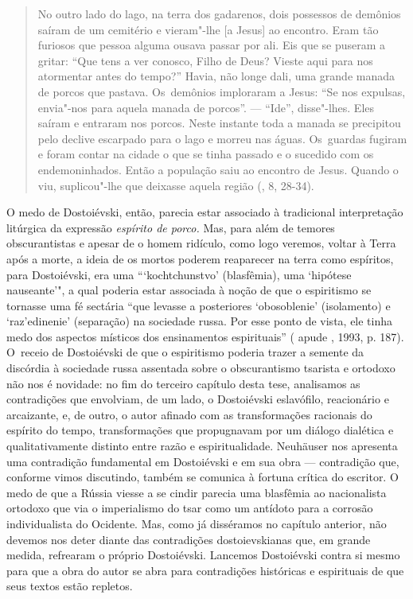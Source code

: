 \begin{quote}
No outro lado do lago, na terra dos gadarenos, dois possessos de
demônios saíram de um cemitério e vieram"-lhe {[}a Jesus{]} ao encontro.
Eram tão furiosos que pessoa alguma ousava passar por ali. Eis que se
puseram a gritar: ``Que tens a ver conosco, Filho de Deus? Vieste aqui
para nos atormentar antes do tempo?'' Havia, não longe dali, uma grande
manada de porcos que pastava. Os~demônios imploraram a Jesus: ``Se nos
expulsas, envia"-nos para aquela manada de porcos''. --- ``Ide'',
disse"-lhes. Eles saíram e entraram nos porcos. Neste instante toda a
manada se precipitou pelo declive escarpado para o lago e morreu nas
águas. Os~guardas fugiram e foram contar na cidade o que se tinha
passado e o sucedido com os endemoninhados. Então a população saiu ao
encontro de Jesus. Quando o viu, suplicou"-lhe que deixasse aquela região
(, 8, 28-34).
\end{quote}

O medo de Dostoiévski, então, parecia estar associado à tradicional
interpretação litúrgica da expressão \emph{espírito de porco.} Mas, para
além de temores obscurantistas e apesar de o homem ridículo, como logo
veremos, voltar à Terra após a morte, a ideia de os mortos poderem
reaparecer na terra como espíritos, para Dostoiévski, era uma
```kochtchunstvo' (blasfêmia), uma `hipótese nauseante'", a qual
poderia estar associada à noção de que o espiritismo se tornasse uma fé
sectária ``que levasse a posteriores `obosoblenie' (isolamento) e
`raz'edinenie' (separação) na sociedade russa. Por esse ponto de
vista, ele tinha medo dos aspectos místicos dos ensinamentos
espirituais'' ( apude , 1993, p. 187). O~receio de
Dostoiévski de que o espiritismo poderia trazer a semente da discórdia à
sociedade russa assentada sobre o obscurantismo tsarista e ortodoxo não
nos é novidade: no fim do terceiro capítulo desta tese, analisamos as
contradições que envolviam, de um lado, o Dostoiévski eslavófilo,
reacionário e arcaizante, e, de outro, o autor afinado com as
transformações racionais do espírito do tempo, transformações que
propugnavam por um diálogo dialética e qualitativamente distinto entre
razão e espiritualidade. Neuhäuser nos apresenta uma contradição
fundamental em Dostoiévski e em sua obra --- contradição que, conforme
vimos discutindo, também se comunica à fortuna crítica do escritor. O
medo de que a Rússia viesse a se cindir parecia uma blasfêmia ao
nacionalista ortodoxo que via o imperialismo do tsar como um antídoto
para a corrosão individualista do Ocidente. Mas, como já disséramos no
capítulo anterior, não devemos nos deter diante das contradições
dostoievskianas que, em grande medida, refrearam o próprio Dostoiévski.
Lancemos Dostoiévski contra si mesmo para que a obra do autor se abra
para contradições históricas e espirituais de que seus textos estão
repletos.

